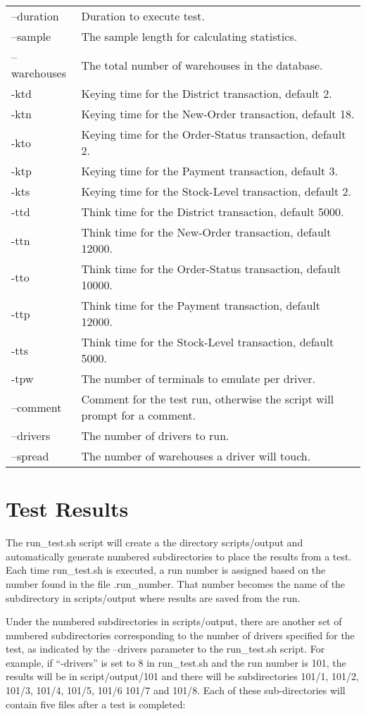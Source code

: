 \documentclass{article}
\begin{document}
\begin{tabular}[c]{ll}
--duration	&	Duration to execute test. \\
--sample	&	The sample length for calculating statistics. \\
--warehouses	&	The total number of warehouses in the database. \\
-ktd		&	Keying time for the District transaction, default 2. \\
-ktn		&	Keying time for the New-Order transaction, default
			18. \\
-kto		&	Keying time for the Order-Status transaction, default
			2. \\
-ktp		&	Keying time for the Payment transaction, default 3. \\
-kts		&	Keying time for the Stock-Level transaction, default
			2. \\
-ttd		&	Think time for the District transaction, default
			5000. \\
-ttn		&	Think time for the New-Order transaction, default
			12000. \\
-tto		&	Think time for the Order-Status transaction, default
			10000. \\
-ttp		&	Think time for the Payment transaction, default
			12000. \\
-tts		&	Think time for the Stock-Level transaction, default
			5000. \\
-tpw		&	The number of terminals to emulate per driver. \\
--comment	&	Comment for the test run, otherwise the script will
			prompt for a comment. \\
--drivers	&	The number of drivers to run. \\
--spread	&	The number of warehouses a driver will touch. \\
\end{tabular}

\section{Test Results}

The run\_test.sh script will create a the directory scripts/output and
automatically generate numbered subdirectories to place the results from a
test.  Each time run\_test.sh is executed, a run number is assigned based on
the number found in the file .run\_number.  That number becomes the name of
the subdirectory in scripts/output where results are saved from the run.

\noindent
Under the numbered subdirectories in scripts/output, there are another set of
numbered subdirectories corresponding to the number of drivers specified for
the test, as indicated by the --drivers parameter to the run\_test.sh script.
For example, if ``-drivers'' is set to 8 in run\_test.sh and the run number is
101, the results will be in script/output/101 and there will be subdirectories
101/1, 101/2, 101/3, 101/4, 101/5, 101/6 101/7 and 101/8.  Each of these
sub-directories will contain five files after a test is completed:
\end{document}
